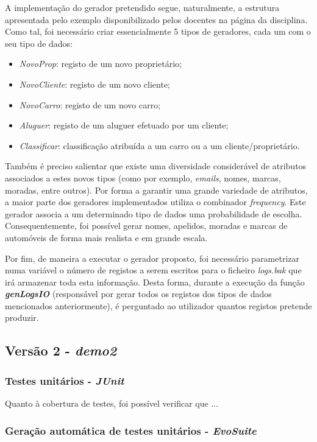 \documentclass[a4paper]{report}
\begin{document}
A implementação do gerador pretendido segue, naturalmente, a estrutura apresentada pelo exemplo disponibilizado pelos docentes na página da disciplina. Como tal, foi necessário criar essencialmente 5 tipos de geradores, cada um com o seu tipo de dados:
\begin{itemize}
    \item \textit{NovoProp}: registo de um novo proprietário;
    \item \textit{NovoCliente}: registo de um novo cliente;
    \item \textit{NovoCarro}: registo de um novo carro;
    \item \textit{Aluguer}: registo de um aluguer efetuado por um cliente;
    \item \textit{Classificar}: classificação atribuída a um carro ou a um cliente/proprietário.
\end{itemize}

Também é preciso salientar que existe uma diversidade considerável de atributos associados a estes novos tipos (como por exemplo, \textit{emails}, nomes, marcas, moradas, entre outros). Por forma a garantir uma grande variedade de atributos, a maior parte dos geradores implementados utiliza o combinador \textit{frequency}. Este gerador associa a um determinado tipo de dados uma probabilidade de escolha. Consequentemente, foi possível gerar nomes, apelidos, moradas e marcas de automóveis de forma mais realista e em grande escala.

Por fim, de maneira a executar o gerador proposto, foi necessário parametrizar numa variável o número de registos a serem escritos para o ficheiro \textit{logs.bak} que irá armazenar toda esta informação. Desta forma, durante a execução da função \textbf{\textit{genLogsIO}} (responsável por gerar todos os registos dos tipos de dados mencionados anteriormente), é perguntado ao utilizador quantos registos pretende produzir.

\subsection{Versão 2 - \textit{demo2}}

\subsubsection{Testes unitários - \textit{JUnit}}

Quanto à cobertura de testes, foi possível verificar que ...

\subsubsection{Geração automática de testes unitários - \textit{EvoSuite}}
\end{document}
